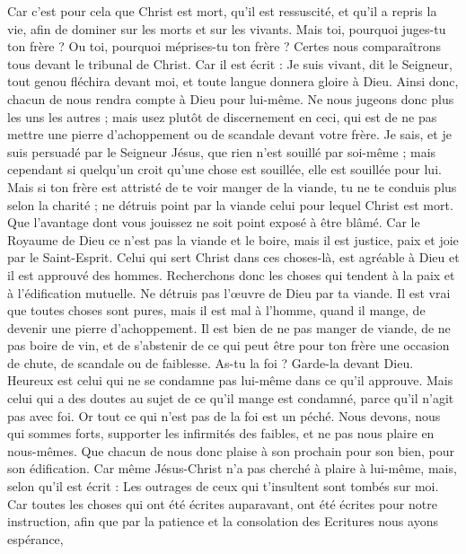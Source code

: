 \begin{multicols}{2}
Car c'est pour cela que Christ est mort, qu'il est ressuscité, et qu'il a repris la vie, afin de dominer sur les morts et sur les vivants.
Mais toi, pourquoi juges-tu ton frère ? Ou toi, pourquoi méprises-tu ton frère ? Certes nous comparaîtrons tous devant le tribunal de Christ.
Car il est écrit : Je suis vivant, dit le Seigneur, tout genou fléchira devant moi, et toute langue donnera gloire à Dieu.
 Ainsi donc, chacun de nous rendra compte à Dieu pour lui-même.
Ne nous jugeons donc plus les uns les autres ; mais usez plutôt de discernement en ceci, qui est de ne pas mettre une pierre d'achoppement ou de scandale devant votre frère.
Je sais, et je suis persuadé par le Seigneur Jésus, que rien n'est souillé par soi-même ; mais cependant si quelqu'un croit qu'une chose est souillée, elle est souillée pour lui.
Mais si ton frère est attristé de te voir manger de la viande, tu ne te conduis plus selon la charité ; ne détruis point par la viande celui pour lequel Christ est mort.
Que l'avantage dont vous jouissez ne soit point exposé à être blâmé.
Car le Royaume de Dieu ce n'est pas la viande et le boire, mais il est justice, paix et joie par le Saint-Esprit.
Celui qui sert Christ dans ces choses-là, est agréable à Dieu et il est approuvé des hommes.
Recherchons donc les choses qui tendent à la paix et à l'édification mutuelle.
Ne détruis pas l'œuvre de Dieu par ta viande. Il est vrai que toutes choses sont pures, mais il est mal à l'homme, quand il mange, de devenir une pierre d'achoppement.
Il est bien de ne pas manger de viande, de ne pas boire de vin, et de s'abstenir de ce qui peut être pour ton frère une occasion de chute, de scandale ou de faiblesse.
As-tu la foi ? Garde-la devant Dieu. Heureux est celui qui ne se condamne pas lui-même dans ce qu'il approuve.
Mais celui qui a des doutes au sujet de ce qu'il mange est condamné, parce qu'il n'agit pas avec foi. Or tout ce qui n'est pas de la foi est un péché.
\VerseOne{}Nous devons, nous qui sommes forts, supporter les infirmités des faibles, et ne pas nous plaire en nous-mêmes.
Que chacun de nous donc plaise à son prochain pour son bien, pour son édification.
Car même Jésus-Christ n'a pas cherché à plaire à lui-même, mais, selon qu'il est écrit : Les outrages de ceux qui t'insultent sont tombés sur moi.
Car toutes les choses qui ont été écrites auparavant, ont été écrites pour notre instruction, afin que par la patience et la consolation des Ecritures nous ayons espérance,

\end{multicols}
